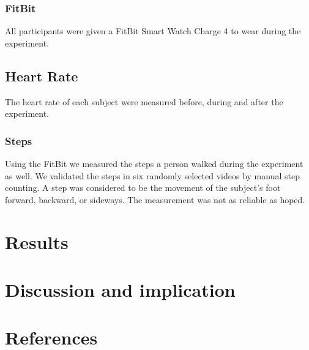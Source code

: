 \documentclass[
  man]{apa6}
\begin{document}
\hypertarget{fitbit}{%
\subsubsection{FitBit}\label{fitbit}}

All participants were given a FitBit Smart Watch Charge 4 to wear during the experiment.

\hypertarget{heart-rate}{%
\subsection{Heart Rate}\label{heart-rate}}

The heart rate of each subject were measured before, during and after the experiment.

\hypertarget{steps}{%
\subsubsection{Steps}\label{steps}}

Using the FitBit we measured the steps a person walked during the experiment as well. We validated the steps in six randomly selected videos by manual step counting. A step was considered to be the movement of the subject's foot forward, backward, or sideways. The measurement was not as reliable as hoped.

\hypertarget{results}{%
\section{Results}\label{results}}

\hypertarget{discussion-and-implication}{%
\section{Discussion and implication}\label{discussion-and-implication}}

\newpage

\hypertarget{references}{%
\section{References}\label{references}}
\end{document}
